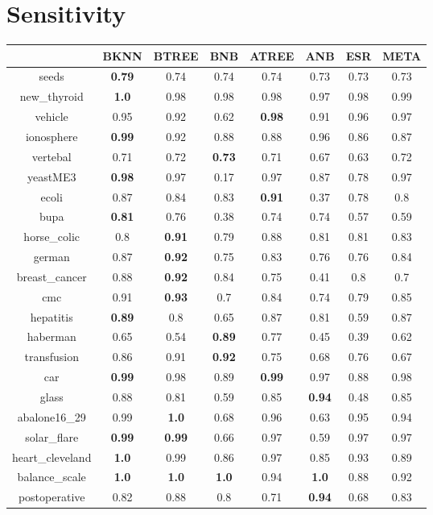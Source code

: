 \documentclass{article}%
\begin{document}
%
\section*{Sensitivity}%
\begin{tabular}{c|ccccccc}%
\hline%
&BKNN&BTREE&BNB&ATREE&ANB&ESR&META\\%
\hline%
seeds&\textbf{0.79}&0.74&0.74&0.74&0.73&0.73&0.73\\%
new\_thyroid&\textbf{1.0}&0.98&0.98&0.98&0.97&0.98&0.99\\%
vehicle&0.95&0.92&0.62&\textbf{0.98}&0.91&0.96&0.97\\%
ionosphere&\textbf{0.99}&0.92&0.88&0.88&0.96&0.86&0.87\\%
vertebal&0.71&0.72&\textbf{0.73}&0.71&0.67&0.63&0.72\\%
yeastME3&\textbf{0.98}&0.97&0.17&0.97&0.87&0.78&0.97\\%
ecoli&0.87&0.84&0.83&\textbf{0.91}&0.37&0.78&0.8\\%
bupa&\textbf{0.81}&0.76&0.38&0.74&0.74&0.57&0.59\\%
horse\_colic&0.8&\textbf{0.91}&0.79&0.88&0.81&0.81&0.83\\%
german&0.87&\textbf{0.92}&0.75&0.83&0.76&0.76&0.84\\%
breast\_cancer&0.88&\textbf{0.92}&0.84&0.75&0.41&0.8&0.7\\%
cmc&0.91&\textbf{0.93}&0.7&0.84&0.74&0.79&0.85\\%
hepatitis&\textbf{0.89}&0.8&0.65&0.87&0.81&0.59&0.87\\%
haberman&0.65&0.54&\textbf{0.89}&0.77&0.45&0.39&0.62\\%
transfusion&0.86&0.91&\textbf{0.92}&0.75&0.68&0.76&0.67\\%
car&\textbf{0.99}&0.98&0.89&\textbf{0.99}&0.97&0.88&0.98\\%
glass&0.88&0.81&0.59&0.85&\textbf{0.94}&0.48&0.85\\%
abalone16\_29&0.99&\textbf{1.0}&0.68&0.96&0.63&0.95&0.94\\%
solar\_flare&\textbf{0.99}&\textbf{0.99}&0.66&0.97&0.59&0.97&0.97\\%
heart\_cleveland&\textbf{1.0}&0.99&0.86&0.97&0.85&0.93&0.89\\%
balance\_scale&\textbf{1.0}&\textbf{1.0}&\textbf{1.0}&0.94&\textbf{1.0}&0.88&0.92\\%
postoperative&0.82&0.88&0.8&0.71&\textbf{0.94}&0.68&0.83\\%
\end{tabular}
\end{document}

